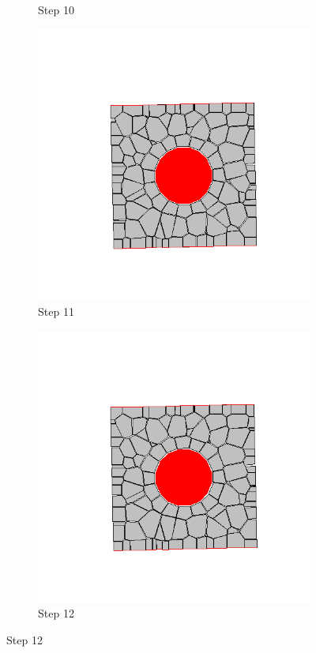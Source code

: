 \begin{figure}[ht!]
\begin{subfigure}{.25\textwidth}
      \caption{Step 10}
      \end{subfigure}%
      \begin{subfigure}{.25\textwidth}
        \centering
        \includegraphics[width=1.0\linewidth]{Files/Small_DEF/CR/DEP5-STEP(011).png}
      \caption{Step 11}
      \end{subfigure}%
      \begin{subfigure}{.25\textwidth}
        \centering
        \includegraphics[width=1.0\linewidth]{Files/Small_DEF/CR/DEP5-STEP(012).png}
      \caption{Step 12}
      \end{subfigure}


\end{figure}
